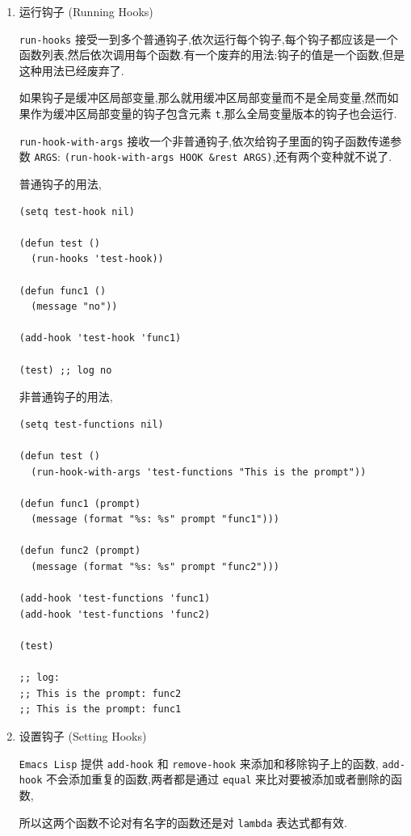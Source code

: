 \documentclass[11pt]{article}
\begin{document}
\begin{enumerate}
\item 运行钩子 (Running Hooks)
\label{sec:org8e62667}

\texttt{run-hooks} 接受一到多个普通钩子,依次运行每个钩子,每个钩子都应该是一个函数列表,然后依次调用每个函数.有一个废弃的用法:钩子的值是一个函数,但是这种用法已经废弃了.

如果钩子是缓冲区局部变量,那么就用缓冲区局部变量而不是全局变量,然而如果作为缓冲区局部变量的钩子包含元素 \texttt{t},那么全局变量版本的钩子也会运行.


\texttt{run-hook-with-args} 接收一个非普通钩子,依次给钩子里面的钩子函数传递参数 \texttt{ARGS}: \texttt{(run-hook-with-args HOOK \&rest ARGS)},还有两个变种就不说了.

普通钩子的用法,

\begin{verbatim}
(setq test-hook nil)

(defun test ()
  (run-hooks 'test-hook))

(defun func1 ()
  (message "no"))

(add-hook 'test-hook 'func1)

(test) ;; log no
\end{verbatim}


非普通钩子的用法,

\begin{verbatim}
(setq test-functions nil)

(defun test ()
  (run-hook-with-args 'test-functions "This is the prompt"))

(defun func1 (prompt)
  (message (format "%s: %s" prompt "func1")))

(defun func2 (prompt)
  (message (format "%s: %s" prompt "func2")))

(add-hook 'test-functions 'func1)
(add-hook 'test-functions 'func2)

(test)

;; log:
;; This is the prompt: func2
;; This is the prompt: func1
\end{verbatim}




\item 设置钩子 (Setting Hooks)
\label{sec:orgbcc45e1}

\texttt{Emacs Lisp} 提供 \texttt{add-hook} 和 \texttt{remove-hook} 来添加和移除钩子上的函数, \texttt{add-hook} 不会添加重复的函数,两者都是通过 \texttt{equal} 来比对要被添加或者删除的函数,

所以这两个函数不论对有名字的函数还是对 \texttt{lambda} 表达式都有效.
\end{enumerate}
\end{document}
